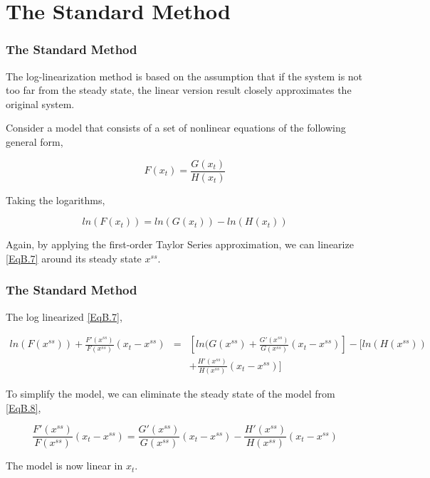 \documentclass[10pt, handout]{beamer}
\begin{document}
\section{The Standard Method}

\begin{frame}

\frametitle{The Standard Method} \vskip 0.1in

{\footnotesize{The log-linearization method is based on the assumption that if the
system is not too far from the steady state, the linear version
result closely approximates the original system.}}\vskip 0.1in

Consider a model that consists of a set of nonlinear equations of
the following general form,

\begin{equation}\label{EqB.6}
F(x_{t})=\frac{G(x_t)}{H(x_t)}
\end{equation}

Taking the logarithms,

\begin{equation}\label{EqB.7}
ln(F(x_{t}))=ln(G(x_t))- ln(H(x_t))
\end{equation}

Again, by applying the first-order Taylor Series approximation, we
can linearize \eqref{EqB.7} around its steady state $x^{ss}$.


\end{frame}

\begin{frame}

\frametitle{The Standard Method} \vskip 0.1in

The log linearized \eqref{EqB.7},

{\scriptsize{
\begin{eqnarray}\label{EqB.8}
ln(F(x^{ss})) + \frac{F'(x^{ss})}{F(x^{ss})}(x_t-x^{ss}) &=&
[ln(G(x^{ss}) + \frac{G'(x^{ss})}{G(x^{ss})}(x_t-x^{ss})] -
[ln(H(x^{ss})) \nonumber\\
&& + \frac{H'(x^{ss})}{H(x^{ss})}(x_t-x^{ss})]
\end{eqnarray}}}

\pause

To simplify the model, we can eliminate the steady state of the
model from \eqref{EqB.8},

\begin{equation}\label{EqB.9}
\frac{F'(x^{ss})}{F(x^{ss})}(x_t-x^{ss}) =
\frac{G'(x^{ss})}{G(x^{ss})}(x_t-x^{ss}) -
\frac{H'(x^{ss})}{H(x^{ss})}(x_t-x^{ss})
\end{equation}

The model is now linear in $x_t$.
\end{frame}
\end{document}
